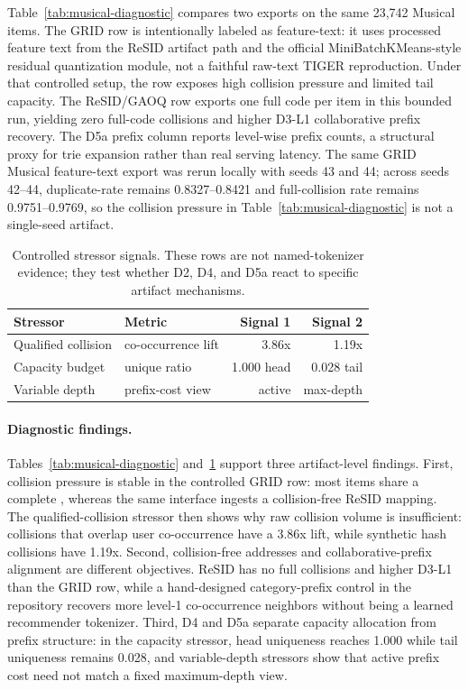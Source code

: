 Table~\ref{tab:musical-diagnostic} compares two exports on the same 23,742
Musical items. The GRID row is intentionally labeled as feature-text: it uses
processed feature text from the ReSID artifact path and the official
MiniBatchKMeans-style residual quantization module, not a faithful raw-text
TIGER reproduction. Under that controlled setup, the row exposes high collision
pressure and limited tail capacity. The ReSID/GAOQ row exports one full code
per item in this bounded run, yielding zero full-code collisions and higher
D3-L1 collaborative prefix recovery. The D5a prefix column reports level-wise
prefix counts, a structural proxy for trie expansion rather than real serving
latency.
The same GRID Musical feature-text export was rerun locally with seeds 43 and
44; across seeds 42--44, duplicate-\sid rate remains 0.8327--0.8421 and
full-collision rate remains 0.9751--0.9769, so the collision pressure in
Table~\ref{tab:musical-diagnostic} is not a single-seed artifact.

\begin{table}[H]
\caption{Controlled stressor signals. These rows are not named-tokenizer
evidence; they test whether D2, D4, and D5a react to specific artifact
mechanisms.}
\label{tab:controller-stressors}
\small
\setlength{\tabcolsep}{3pt}
\begin{tabular}{@{}l l r r@{}}
\toprule
Stressor & Metric & Signal 1 & Signal 2 \\
\midrule
Qualified collision & co-occurrence lift & 3.86x & 1.19x \\
Capacity budget & unique ratio & 1.000 head & 0.028 tail \\
Variable depth & prefix-cost view & active & max-depth \\
\bottomrule
\end{tabular}
\end{table}

\paragraph{Diagnostic findings.}
Tables~\ref{tab:musical-diagnostic} and~\ref{tab:controller-stressors} support
three artifact-level findings. First, collision pressure is stable in the
controlled GRID row: most items share a complete \sid{}, whereas the same
interface ingests a collision-free ReSID mapping. The qualified-collision
stressor then shows why raw collision volume is insufficient: collisions that
overlap user co-occurrence have a 3.86x lift, while synthetic hash collisions
have 1.19x. Second, collision-free addresses and collaborative-prefix alignment
are different objectives. ReSID has no full collisions and higher D3-L1 than
the GRID row, while a hand-designed category-prefix control in the repository
recovers more level-1 co-occurrence neighbors without being a learned
recommender tokenizer. Third, D4 and D5a separate capacity allocation from
prefix structure: in the capacity stressor, head uniqueness reaches 1.000
while tail uniqueness remains 0.028, and variable-depth stressors show that
active prefix cost need not match a fixed maximum-depth view.

